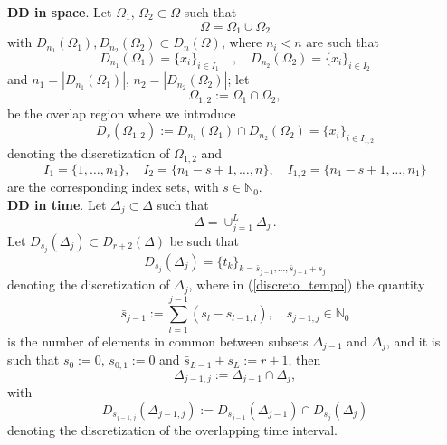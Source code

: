 \documentclass[smallcondensed]{svjour3}
\begin{document}
\noindent \textbf{DD in space}.  Let $\Omega_{1}$, $\Omega_{2}\subset \Omega$ such that
\begin{equation}\label{subdomains_space}
\Omega= \Omega_{1}\cup \Omega_{2}
\end{equation}
with $D_{n_{1}}(\Omega_{1}),D_{n_{2}}(\Omega_{2}) \subset D_{n}(\Omega)$, where $n_{i}<n$ are such that 
\begin{equation}\label{disc_1e2}
D_{n_{1}}(\Omega_{1})=\{x_{i}\}_{i\in I_{1}} \quad , \quad D_{n_{2}}(\Omega_{2})=\{x_{i}\}_{i\in I_{2}}
\end{equation}
and  $n_{1}=|D_{n_{1}}(\Omega_{1})|$, $n_{2}=|D_{n_{2}}(\Omega_{2})|$; let 
\begin{equation}\label{overlap_domain}
\Omega_{1,2}:=\Omega_{1}\cap \Omega_{2}, 
\end{equation}
be the overlap region where we introduce 
\begin{equation}\label{disc12}
D_{s}(\Omega_{1,2}):=D_{n_{1}}(\Omega_{1})\cap D_{n_{2}}(\Omega_{2})=\{x_{i}\}_{i\in I_{1,2}}
\end{equation}
denoting the discretization of $\Omega_{1,2}$ and
\begin{equation}\label{set_indici}
I_{1}=\{1,\ldots,n_{1}\} ,\quad I_{2}=\{n_{1}-s+1,\ldots,n\}, \quad I_{1,2}=\{n_{1}-s+1,\ldots,n_{1}\}
\end{equation}
are the corresponding index sets, with $s\in \mathbb{N}_{0}$.\\

\noindent \textbf{DD in time}. Let  $\Delta_{j}\subset \Delta$ such that
\begin{equation}
\Delta=\cup_{j=1}^{L} \Delta_{j}\,.
\end{equation}
Let $D_{s_{j}}(\Delta_{j}) \subset D_{r+2}(\Delta)$ be  such that 
\begin{equation}\label{discreto_tempo}
D_{s_{j}}(\Delta_{j})=\{t_{k}\}_{k=\bar{s}_{j-1},\ldots,\bar{s}_{j-1}+s_{j}}
\end{equation}
denoting the discretization of $\Delta_j$, 
where in (\ref{discreto_tempo})
the quantity 
\begin{equation}\label{essesign}
    \bar{s}_{j-1}:=\sum_{l=1}^{j-1}(s_{l}-s_{l-1,l}), \quad  s_{j-1,j}\in \mathbb{N}_{0}
\end{equation} is the number of elements in common between  subsets $\Delta_{j-1}$ and $\Delta_{j}$, and it is such that $s_{0}:= 0$, $s_{0,1}:= 0$ and $\bar{s}_{L-1}+s_{L}:= r+1$,
then
\begin{equation}
\Delta_{j-1,j}:=\Delta_{j-1}\cap \Delta_{j}, 
\end{equation}
with $$D_{s_{j-1,j}}(\Delta_{j-1,j}):=D_{s_{j-1}}(\Delta_{j-1})\cap D_{s_{j}}(\Delta_{j})$$ denoting the discretization of the overlapping time interval. \\
\end{document}
